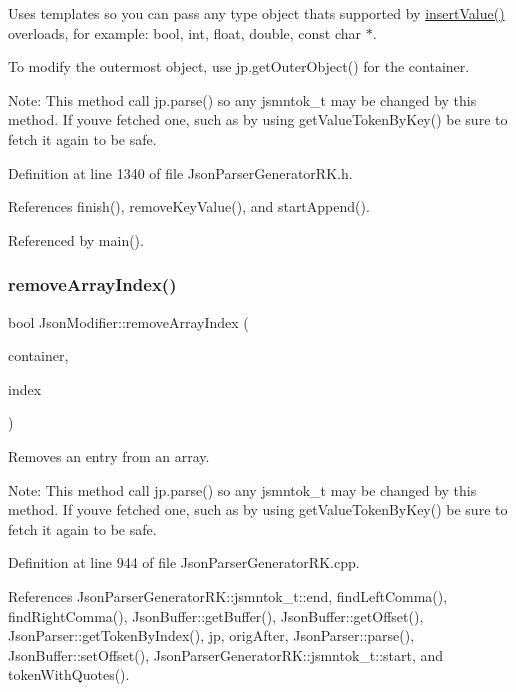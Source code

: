 Uses templates so you can pass any type object that\textquotesingle{}s supported by \hyperlink{class_json_writer_ac58734c238ba7be066838591b0cc7743}{insert\+Value()} overloads, for example\+: bool, int, float, double, const char $\ast$.

To modify the outermost object, use jp.\+get\+Outer\+Object() for the container.

Note\+: This method call jp.\+parse() so any jsmntok\+\_\+t may be changed by this method. If you\textquotesingle{}ve fetched one, such as by using get\+Value\+Token\+By\+Key() be sure to fetch it again to be safe. 

Definition at line 1340 of file Json\+Parser\+Generator\+R\+K.\+h.



References finish(), remove\+Key\+Value(), and start\+Append().



Referenced by main().

\mbox{\label{class_json_modifier_aba45c4fe467fa70b837f190986cf190b}} 
\subsubsection{\texorpdfstring{remove\+Array\+Index()}{removeArrayIndex()}}
{\footnotesize\ttfamily bool Json\+Modifier\+::remove\+Array\+Index (\begin{DoxyParamCaption}\item[{const \hyperlink{struct_json_parser_generator_r_k_1_1jsmntok__t}{Json\+Parser\+Generator\+R\+K\+::jsmntok\+\_\+t} $\ast$}]{container,  }\item[{size\+\_\+t}]{index }\end{DoxyParamCaption})}



Removes an entry from an array. 

Note\+: This method call jp.\+parse() so any jsmntok\+\_\+t may be changed by this method. If you\textquotesingle{}ve fetched one, such as by using get\+Value\+Token\+By\+Key() be sure to fetch it again to be safe. 

Definition at line 944 of file Json\+Parser\+Generator\+R\+K.\+cpp.



References Json\+Parser\+Generator\+R\+K\+::jsmntok\+\_\+t\+::end, find\+Left\+Comma(), find\+Right\+Comma(), Json\+Buffer\+::get\+Buffer(), Json\+Buffer\+::get\+Offset(), Json\+Parser\+::get\+Token\+By\+Index(), jp, orig\+After, Json\+Parser\+::parse(), Json\+Buffer\+::set\+Offset(), Json\+Parser\+Generator\+R\+K\+::jsmntok\+\_\+t\+::start, and token\+With\+Quotes().



